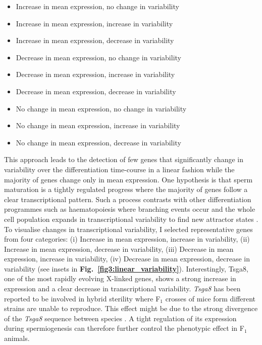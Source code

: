 \begin{itemize}
\itemsep0em 
\item Increase in mean expression, no change in variability
\item Increase in mean expression, increase in variability
\item Increase in mean expression, decrease in variability
\item Decrease in mean expression, no change in variability
\item Decrease in mean expression, increase in variability
\item Decrease in mean expression, decrease in variability
\item No change in mean expression, no change in variability
\item No change in mean expression, increase in variability
\item No change in mean expression, decrease in variability
\end{itemize}

This approach leads to the detection of few genes that significantly change in variability over the differentiation time-course in a linear fashion while the majority of genes change only in mean expression. One hypothesis is that sperm maturation is a tightly regulated progress where the majority of genes follow a clear transcriptional pattern. Such a process contrasts with other differentiation programmes such as haematopoiesis where branching events occur and the whole cell population expands in transcriptional variability to find new attractor states \citep{Mojtahedi2016}. To visualise changes in transcriptional variability, I selected representative genes from four categories: (i) Increase in mean expression, increase in variability, (ii) Increase in mean expression, decrease in variability, (iii) Decrease in mean expression, increase in variability, (iv) Decrease in mean expression, decrease in variability (see insets in \textbf{Fig.~\ref{fig3:linear_variability}}). Interestingly, \gls{Tsga8}, one of the most rapidly evolving X-linked genes, shows a strong increase in expression and a clear decrease in transcriptional variability. \emph{Tsga8} has been reported to be involved in hybrid sterility where F$_1$ crosses of mice form different strains are unable to reproduce. This effect might be due to the strong divergence of the \emph{Tsga8} sequence between species \citep{Good2011}. A tight regulation of its expression during spermiogenesis can therefore further control the phenotypic effect in F$_1$ animals.

